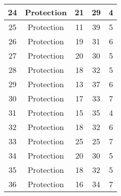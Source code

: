 \documentclass[results.tex]{subfiles}
\begin{document}
\begin{center}
\begin{tabular}{| c || c | c | c | c |}
            \hline
            24                      & Protection                   & 21                     & 29                      & 4                    \\
            \hline
            25                      & Protection                   & 11                     & 39                      & 5                    \\
            \hline
            26                      & Protection                   & 19                     & 31                      & 6                    \\
            \hline
            27                      & Protection                   & 20                     & 30                      & 5                    \\
            \hline
            28                      & Protection                   & 18                     & 32                      & 5                    \\
            \hline
            29                      & Protection                   & 13                     & 37                      & 6                    \\
            \hline
            30                      & Protection                   & 17                     & 33                      & 7                    \\
            \hline
            31                      & Protection                   & 15                     & 35                      & 4                    \\
            \hline
            32                      & Protection                   & 18                     & 32                      & 6                    \\
            \hline
            33                      & Protection                   & 25                     & 25                      & 7                    \\
            \hline
            34                      & Protection                   & 20                     & 30                      & 5                    \\
            \hline
            35                      & Protection                   & 18                     & 32                      & 5                    \\
            \hline
            36                      & Protection                   & 16                     & 34                      & 7                    \\

\end{tabular}
\end{center}
\end{document}

